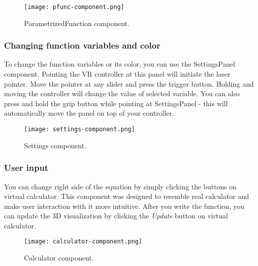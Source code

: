\begin{figure}[ht!]
\centering
\texttt{[image: pfunc-component.png]}
\caption{ParametrizedFunction component.}
\label{r:77}
\end{figure}

\newpage
\subsubsection*{Changing function variables and color}
To change the function variables or its color, you can use the SettingsPanel component. Pointing the VR controller at this panel will initiate the laser pointer. Move the pointer at any slider and press the trigger button. Holding and moving the controller will change the value of selected variable. You can also press and hold the grip button while pointing at SettingsPanel - this will automatically move the panel on top of your controller.
 
\begin{figure}[ht!]
\centering
\texttt{[image: settings-component.png]}
\caption{Settings component.}
\label{r:78}
\end{figure}

\newpage
\subsubsection*{User input}
You can change right side of the equation by simply clicking the buttons on virtual calculator. This component was designed to resemble real calculator and make user interaction with it more intuitive. After you write the function, you can update the 3D visualization by clicking the \textsl{Update} button on virtual calculator.

\begin{figure}[ht!]
\centering
\texttt{[image: calculator-component.png]}
\caption{Calculator component.}
\label{r:78}
\end{figure}